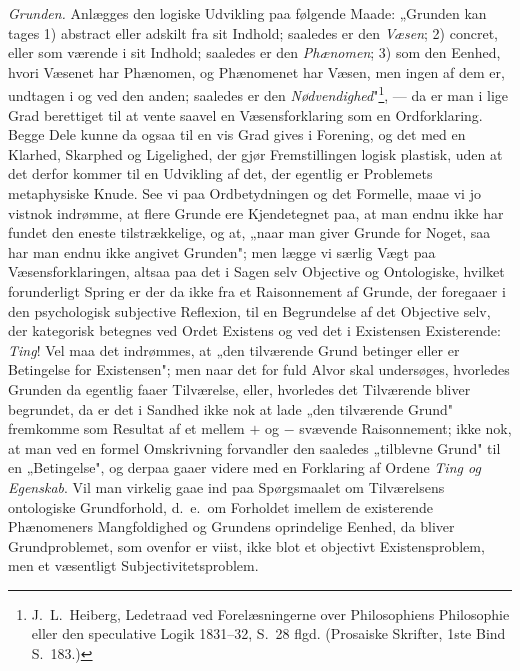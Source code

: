 \documentclass[12pt]{book}
\newcommand{\opage}[1]{\marginnote{\footnotesize\textit{[#1]}}}
\begin{document}
\emph{Grunden.} Anlægges den logiske Udvikling paa følgende Maade: „Grunden kan tages 1)
abstract eller adskilt fra sit Indhold; saaledes er den \emph{Væsen}; 2) concret, eller
som værende i sit Indhold; saaledes er den \emph{Phænomen}; 3) som den Eenhed, hvori
\opage{135} Væsenet har Phænomen, og Phænomenet har Væsen, men ingen af dem er, undtagen i og ved den
anden; saaledes er den \emph{Nødvendighed}"\footnote{J.\ L.\ Heiberg, Ledetraad ved
Forelæsningerne over Philosophiens Philosophie eller den speculative Logik 1831--32,
S.~28 flgd. (Prosaiske Skrifter, 1ste Bind S.~183.)}, --- da er man i lige Grad berettiget
til at vente saavel en Væsensforklaring som en Ordforklaring. Begge Dele kunne da ogsaa
til en vis Grad gives i Forening, og det med en Klarhed, Skarphed og Ligelighed, der gjør
Fremstillingen logisk plastisk, uden at det derfor kommer til en Udvikling af det, der
egentlig er Problemets metaphysiske Knude. See vi paa Ordbetydningen og det Formelle, maae
vi jo vistnok indrømme, at flere Grunde ere Kjendetegnet paa, at man endnu ikke har fundet
den eneste tilstrækkelige, og at, „naar man giver Grunde for Noget, saa har man endnu ikke
angivet Grunden"; men lægge vi særlig Vægt paa Væsensforklaringen, altsaa paa det i Sagen
selv Objective og Ontologiske, hvilket forunderligt Spring er der da ikke fra et
Raisonnement af Grunde, der foregaaer i den psychologisk subjective Reflexion, til en
Begrundelse af det Objective selv, der kategorisk betegnes ved Ordet Existens og ved det i
Existensen Existerende: \emph{Ting}! Vel maa det indrømmes, at „den tilværende Grund
betinger eller er Betingelse for Existensen"; men naar det for fuld Alvor skal undersøges,
hvorledes Grunden da egentlig faaer Tilværelse, eller, hvorledes det Tilværende bliver
begrundet, da er det i Sandhed ikke nok at lade „den tilværende Grund" fremkomme som
Resultat af et mellem $+$ og $-$ svævende Raisonnement; ikke nok, at man ved en formel
Omskrivning forvandler den saaledes „tilblevne Grund" til en „Betingelse", og derpaa gaaer
videre med en Forklaring af Ordene \emph{Ting og Egenskab}. Vil man virkelig gaae ind paa
Spørgsmaalet om Tilværelsens ontologiske Grundforhold, d.\ e.\ om Forholdet imellem de
\opage{136} existerende Phænomeners Mangfoldighed og Grundens oprindelige Eenhed, da bliver
Grundproblemet, som ovenfor er viist, ikke blot et objectivt Existensproblem, men et
væsentligt Subjectivitetsproblem.
\end{document}
